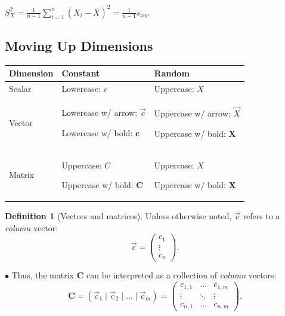 \documentclass[12pt,oneside]{article}
\theoremstyle{definition}
\newtheorem{definition}{Definition}
\theoremstyle{remark}
\begin{document}
\begin{solutionbox}
$S^{2}_{X} = \frac{1}{n - 1} \sum^{n}_{i = 1} (X_i - \bar{X})^{2} = \frac{1}{n - 1} s_{xx}$.
\end{solutionbox}

\subsection{Moving Up Dimensions}

\begin{center}
\renewcommand{\arraystretch}{1.5}
\begin{tabular}{p{6cm}|p{5cm}|p{5cm}}
\textbf{Dimension} & 
\textbf{Constant} & 
\textbf{Random} \\ \hline

Scalar
& Lowercase: $c$
& Uppercase: $X$ \\

\hline

Vector
& Lowercase w/ arrow: $\vec{c}$

Lowercase w/ bold: $\boldsymbol{c}$
& Uppercase w/ arrow: $\vec{X}$

Uppercase w/ bold: $\boldsymbol{X}$ \\

\hline

Matrix
& Uppercase: $C$

Uppercase w/ bold: $\boldsymbol{C}$
& Uppercase: $X$

Uppercase w/ bold: $\boldsymbol{X}$
\end{tabular}
\end{center}

\begin{definition}[Vectors and matrices]
Unless otherwise noted, $\vec{c}$ refers to a \textit{column} vector: \[\vec{c} = 
\begin{pmatrix}
c_1 \\
\vdots \\
c_n
\end{pmatrix}.
\]

$\bullet$ Thus, the matrix $\boldsymbol{C}$ can be interpreted as a collection of \textit{column} vectors: \[\boldsymbol{C} = 
(\vec{c}_1 \mid \vec{c}_2 \mid \ldots \mid \vec{c}_m) =
\begin{pmatrix}
c_{1, 1} & \ldots & c_{1, m} \\
\vdots & \ddots & \vdots \\
c_{n, 1} & \ldots & c_{n, m}
\end{pmatrix}.
\]


\end{definition}
\end{document}
